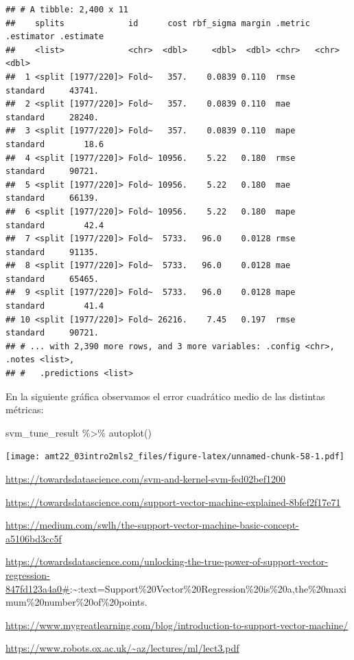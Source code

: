 \documentclass[
]{book}
\newenvironment{Shaded}{\begin{snugshade}}{\end{snugshade}}
\newcommand{\FunctionTok}[1]{\textcolor[rgb]{0.00,0.00,0.00}{#1}}
\newcommand{\NormalTok}[1]{#1}
\newcommand{\SpecialCharTok}[1]{\textcolor[rgb]{0.00,0.00,0.00}{#1}}
\begin{document}
\begin{verbatim}
## # A tibble: 2,400 x 11
##    splits             id      cost rbf_sigma margin .metric .estimator .estimate
##    <list>             <chr>  <dbl>     <dbl>  <dbl> <chr>   <chr>          <dbl>
##  1 <split [1977/220]> Fold~   357.    0.0839 0.110  rmse    standard     43741. 
##  2 <split [1977/220]> Fold~   357.    0.0839 0.110  mae     standard     28240. 
##  3 <split [1977/220]> Fold~   357.    0.0839 0.110  mape    standard        18.6
##  4 <split [1977/220]> Fold~ 10956.    5.22   0.180  rmse    standard     90721. 
##  5 <split [1977/220]> Fold~ 10956.    5.22   0.180  mae     standard     66139. 
##  6 <split [1977/220]> Fold~ 10956.    5.22   0.180  mape    standard        42.4
##  7 <split [1977/220]> Fold~  5733.   96.0    0.0128 rmse    standard     91135. 
##  8 <split [1977/220]> Fold~  5733.   96.0    0.0128 mae     standard     65465. 
##  9 <split [1977/220]> Fold~  5733.   96.0    0.0128 mape    standard        41.4
## 10 <split [1977/220]> Fold~ 26216.    7.45   0.197  rmse    standard     90721. 
## # ... with 2,390 more rows, and 3 more variables: .config <chr>, .notes <list>,
## #   .predictions <list>
\end{verbatim}

En la siguiente gráfica observamos el error cuadrático medio de las distintas métricas:

\begin{Shaded}
\begin{Highlighting}[]
\NormalTok{svm\_tune\_result }\SpecialCharTok{\%\textgreater{}\%} \FunctionTok{autoplot}\NormalTok{()}
\end{Highlighting}
\end{Shaded}

\texttt{[image: amt22\_03intro2mls2\_files/figure-latex/unnamed-chunk-58-1.pdf]}

\url{https://towardsdatascience.com/svm-and-kernel-svm-fed02bef1200}

\url{https://towardsdatascience.com/support-vector-machine-explained-8bfef2f17e71}

\url{https://medium.com/swlh/the-support-vector-machine-basic-concept-a5106bd3cc5f}

\url{https://towardsdatascience.com/unlocking-the-true-power-of-support-vector-regression-847fd123a4a0\#}:\textasciitilde:text=Support\%20Vector\%20Regression\%20is\%20a,the\%20maximum\%20number\%20of\%20points.

\url{https://www.mygreatlearning.com/blog/introduction-to-support-vector-machine/}

\url{https://www.robots.ox.ac.uk/~az/lectures/ml/lect3.pdf}

  
\end{document}
